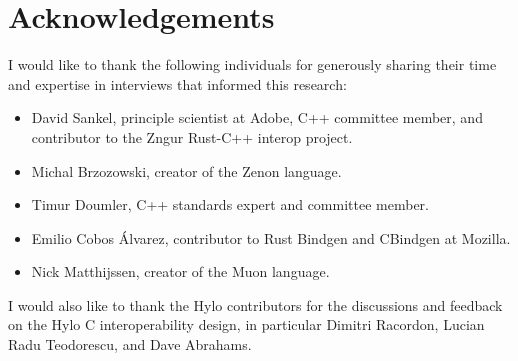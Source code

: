 \section*{Acknowledgements}
I would like to thank the following individuals for generously sharing their time and expertise in interviews that informed this research:
\begin{itemize}
    \item David Sankel, principle scientist at Adobe, C++ committee member, and contributor to the Zngur Rust-C++ interop project\cite{zngur}.
    \item Michal Brzozowski, creator of the Zenon language\cite{zenon-lang}.
    \item Timur Doumler, C++ standards expert and committee member.
    \item Emilio Cobos Álvarez, contributor to Rust Bindgen\cite{rust-bindgen} and CBindgen\cite{cbindgen} at Mozilla.
    \item Nick Matthijssen, creator of the Muon language.
\end{itemize}
I would also like to thank the Hylo contributors for the discussions and feedback on the Hylo C interoperability design, in particular Dimitri Racordon, Lucian Radu Teodorescu, and Dave Abrahams.